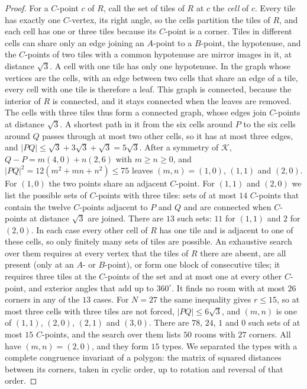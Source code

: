 \documentclass[11pt,a4paper]{article}
\theoremstyle{plain}
\theoremstyle{definition}
\theoremstyle{remark}
\newcommand{\K}{\mathcal{K}}
\newcommand{\dg}{^\circ}
\numberwithin{equation}{section}
\begin{document}
\begin{proof}
For a $C$-point $c$ of $R$, call the set of tiles of $R$ at $c$ the \emph{cell} of $c$. Every tile has exactly one $C$-vertex, its right angle, so the cells partition the tiles of $R$, and each cell has one or three tiles because its $C$-point is a corner. Tiles in different cells can share only an edge joining an $A$-point to a $B$-point, the hypotenuse, and the $C$-points of two tiles with a common hypotenuse are mirror images in it, at distance $\sqrt3$. A cell with one tile has only one hypotenuse. In the graph whose vertices are the cells, with an edge between two cells that share an edge of a tile, every cell with one tile is therefore a leaf. This graph is connected, because the interior of $R$ is connected, and it stays connected when the leaves are removed. The cells with three tiles thus form a connected graph, whose edges join $C$-points at distance $\sqrt3$. A shortest path in it from the six cells around $P$ to the six cells around $Q$ passes through at most two other cells, so it has at most three edges, and $|PQ|\le\sqrt3+3\sqrt3+\sqrt3=5\sqrt3$. After a symmetry of $\K$, $Q-P=m(4,0)+n(2,6)$ with $m\ge n\ge0$, and $|PQ|^2=12(m^2+mn+n^2)\le75$ leaves $(m,n)=(1,0)$, $(1,1)$ and $(2,0)$. For $(1,0)$ the two points share an adjacent $C$-point. For $(1,1)$ and $(2,0)$ we list the possible sets of $C$-points with three tiles: sets of at most $14$ $C$-points that contain the twelve $C$-points adjacent to $P$ and $Q$ and are connected when $C$-points at distance $\sqrt3$ are joined. There are $13$ such sets: $11$ for $(1,1)$ and $2$ for $(2,0)$. In each case every other cell of $R$ has one tile and is adjacent to one of these cells, so only finitely many sets of tiles are possible. An exhaustive search over them requires at every vertex that the tiles of $R$ there are absent, are all present (only at an $A$- or $B$-point), or form one block of consecutive tiles; it requires three tiles at the $C$-points of the set and at most one at every other $C$-point, and exterior angles that add up to $360\dg$. It finds no room with at most $26$ corners in any of the $13$ cases. For $N=27$ the same inequality gives $r\le15$, so at most three cells with three tiles are not forced, $|PQ|\le6\sqrt3$, and $(m,n)$ is one of $(1,1)$, $(2,0)$, $(2,1)$ and $(3,0)$. There are $78$, $24$, $1$ and $0$ such sets of at most $15$ $C$-points, and the search over them lists $50$ rooms with $27$ corners. All have $(m,n)=(2,0)$, and they form $15$ types. We separated the types with a complete congruence invariant of a polygon: the matrix of squared distances between its corners, taken in cyclic order, up to rotation and reversal of that order.
\end{proof}
\end{document}
